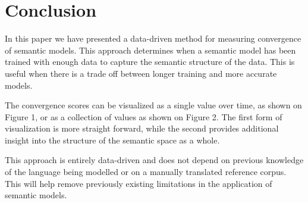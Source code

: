 \documentclass{article} %
\begin{document}
\section{Conclusion}
\label{sec:conclusion}
In this paper we have presented a data-driven method for measuring convergence of semantic models. This approach determines when a semantic model has been trained with enough data to capture the semantic structure of the data. This is useful when there is a trade off between longer training and more accurate models.

The convergence scores can be visualized as a single value over time, as shown on Figure 1, or as a collection of values as shown on Figure 2. The first form of visualization is more straight forward, while the second provides additional insight into the structure of the semantic space as a whole.

This approach is entirely data-driven and does not depend on previous knowledge of the language being modelled or on a manually translated reference corpus. This will help remove previously existing limitations in the application of semantic models.
\end{document}
